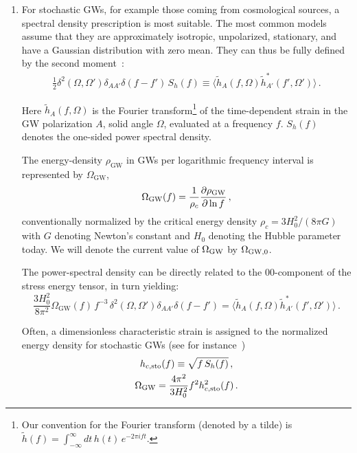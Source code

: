 \documentclass[11pt,a4paper]{article}
\begin{document}
\begin{enumerate}

\item For stochastic GWs, for example those coming from cosmological sources, a spectral density prescription is most suitable. The most common models assume that they are approximately isotropic, unpolarized, stationary, and have a Gaussian distribution with zero mean. They can thus be fully defined by the second moment~\cite{Allen:1999stochastic}:
\begin{gather}
    \frac{1}{2}\delta^2(\Omega,\Omega')\delta_{AA'} \delta(f-f')\,S_h(f) \equiv \langle \tilde{h}_A(f,\Omega) \tilde{h}_{A'}^*(f',\Omega') \rangle  \,.
    \label{eq:Sh}
\end{gather}

Here $\tilde{h}_A(f,\Omega)$ is the Fourier transform\footnote{Our convention for the Fourier transform (denoted by a tilde) is $\tilde{h}(f) = \int_{-\infty}^\infty dt \, h(t)\, e^{- 2 \pi i f t} $.} of the time-dependent strain in the GW polarization $A$, solid angle $\Omega$, evaluated at a frequency $f$. $S_h(f)$ denotes the one-sided power spectral density.

The energy-density $\rho_\text{GW}$ in GWs per logarithmic frequency interval is represented by $\Omega_\mathrm{GW}$,
\begin{equation}
    \Omega_\mathrm{GW}(f) = \frac{1}{\rho_c} \frac{\partial \rho_{\rm GW}}{\partial \ln{f}} \,,
\end{equation}
conventionally normalized by the critical energy density $\rho_c = 3 H_0^2/(8 \pi G)$ with $G$ denoting Newton's constant and $H_0$ denoting the Hubble parameter today. We will denote the current value of $\Omega_{\rm GW}$ by $\Omega_{\rm GW, 0}$.


The power-spectral density can be directly related to the 00-component of the stress energy tensor, in turn yielding:
\begin{equation}
    \frac{3 H_0^2}{8\pi^2} \Omega_\mathrm{GW}(f)\, f^{-3}\, \delta^2(\Omega,\Omega')  \delta_{AA'} \delta(f-f')= \langle \tilde{h}_A(f,\Omega) \tilde{h}_{A'}^*(f',\Omega') \rangle \,.
\end{equation}

Often, a dimensionless characteristic strain is assigned to the normalized energy density for stochastic GWs (see for instance~\cite{Thrane:2013_sen,Romano:2017Detection})
%
\begin{subequations}
    \begin{gather}
        h_{c,\rm sto}(f) \equiv \sqrt{f\, S_h(f)} \,,\label{eq:charstrainstochastic}\\
        \Omega_\mathrm{GW} = \frac{4\pi^2}{3H_0^2}f^2 h_{c,\rm sto}^2(f) \,.    \label{eq:OmegaAmplitude}
    \end{gather}
\end{subequations}



\end{enumerate}
\end{document}
